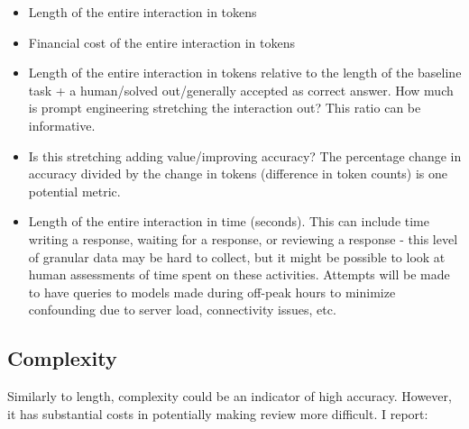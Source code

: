 \documentclass[11pt]{article}
\begin{document}
\begin{itemize}
  \item Length of the entire interaction in tokens
  \item Financial cost of the entire interaction in tokens
  \item Length of the entire interaction in tokens relative to the length of the baseline task + a human/solved out/generally accepted as correct answer. How much is prompt engineering stretching the interaction out? This ratio can be informative.
  \item Is this stretching adding value/improving accuracy? The percentage change in accuracy divided by the change in tokens (difference in token counts) is one potential metric.
  \item Length of the entire interaction in time (seconds). This can include time writing a response, waiting for a response, or reviewing a response - this level of granular data may be hard to collect, but it might be possible to look at human assessments of time spent on these activities. Attempts will be made to have queries to models made during off-peak hours to minimize confounding due to server load, connectivity issues, etc.
\end{itemize}

\subsection*{Complexity}

Similarly to length, complexity could be an indicator of high accuracy. However, it has substantial costs in potentially making review more difficult. I report:
\end{document}
